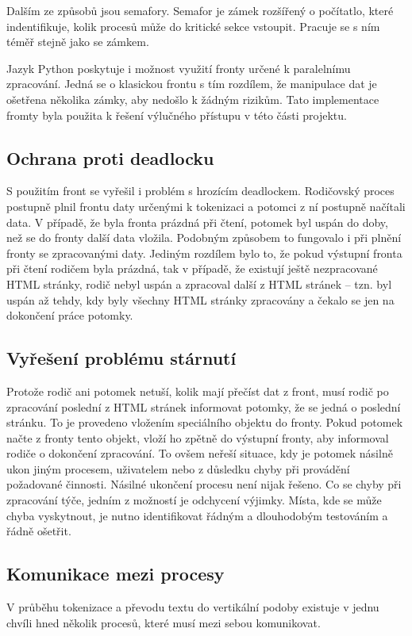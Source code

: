 Dalším ze způsobů jsou semafory. Semafor je zámek rozšířený o počítatlo, které indentifikuje, kolik procesů může
do kritické sekce vstoupit. Pracuje se s ním téměř stejně jako se zámkem.

Jazyk Python poskytuje i možnost využití fronty určené k paralelnímu zpracování. Jedná se o klasickou frontu s tím
rozdílem, že manipulace dat je ošetřena několika zámky, aby nedošlo k žádným rizikům. Tato implementace fromty byla
použita k řešení výlučného přístupu v této části projektu.

\subsection{Ochrana proti deadlocku}
S použitím front se vyřešil i problém s hrozícím deadlockem. Rodičovský proces postupně plnil frontu daty určenými
k tokenizaci a potomci z ní postupně načítali data. V případě, že byla fronta prázdná při čtení, potomek byl uspán
do doby, než se do fronty další data vložila. Podobným způsobem to fungovalo i při plnění fronty se zpracovanými
daty. Jediným rozdílem bylo to, že pokud výstupní fronta při čtení rodičem byla prázdná, tak v případě, že existují
ještě nezpracované HTML stránky, rodič nebyl uspán a zpracoval další z HTML stránek -- tzn. byl uspán až tehdy,
kdy byly všechny HTML stránky zpracovány a čekalo se jen na dokončení práce potomky.

\subsection{Vyřešení problému stárnutí}
Protože rodič ani potomek netuší, kolik mají přečíst dat z front, musí rodič po zpracování poslední z HTML stránek
informovat potomky, že se jedná o poslední stránku. To je provedeno vložením speciálního objektu do fronty. Pokud potomek
načte z fronty tento objekt, vloží ho zpětně do výstupní fronty, aby informoval rodiče o dokončení zpracování. To ovšem
neřeší situace, kdy je potomek násilně ukon jiným procesem, uživatelem nebo z důsledku chyby při provádění požadované
činnosti. Násilné ukončení procesu není nijak řešeno. Co se chyby při zpracování týče, jedním z možností je odchycení výjimky.
Místa, kde se může chyba vyskytnout, je nutno identifikovat řádným a dlouhodobým testováním a řádně ošetřit.

\subsection{Komunikace mezi procesy}
V průběhu tokenizace a převodu textu do vertikální podoby existuje v jednu chvíli hned několik procesů, které musí
mezi sebou komunikovat.

